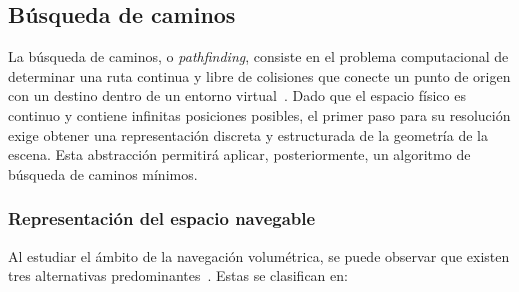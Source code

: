 \subsection{Búsqueda de caminos}

La búsqueda de caminos, o \textit{pathfinding}, consiste en el problema computacional de determinar una ruta continua y libre de colisiones que conecte un punto de origen con un destino dentro de un entorno virtual~\cite{Millington}.
Dado que el espacio físico es continuo y contiene infinitas posiciones posibles, el primer paso para su resolución exige obtener una representación discreta y estructurada de la geometría de la escena.
Esta abstracción permitirá aplicar, posteriormente, un algoritmo de búsqueda de caminos mínimos.

\subsubsection{Representación del espacio navegable}
\label{sec:representacionespacionavegable}

Al estudiar el ámbito de la navegación volumétrica, se puede observar que existen tres alternativas predominantes~\cite{Brewer2015NavMesh}.
Estas se clasifican en:

